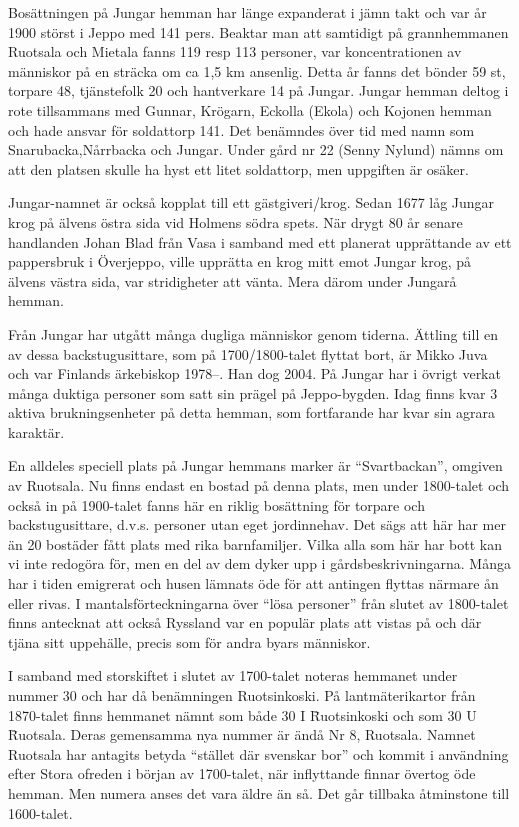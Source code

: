 Bosättningen på Jungar hemman har länge expanderat i jämn takt och var år 1900 störst i Jeppo med 141 pers. Beaktar man att samtidigt på grannhemmanen Ruotsala och Mietala fanns 119 resp 113 personer, var koncentrationen av människor på en sträcka om ca 1,5 km ansenlig. Detta år fanns det bönder 59 st, torpare 48, tjänstefolk 20 och hantverkare 14 på Jungar. Jungar hemman deltog i rote tillsammans med Gunnar, Krögarn, Eckolla (Ekola) och Kojonen hemman och hade ansvar för soldattorp 141. Det benämndes över tid med namn som Snarubacka,Nårrbacka och Jungar. Under gård nr 22 (Senny Nylund) nämns om att den platsen skulle ha hyst ett litet soldattorp, men uppgiften är osäker.

Jungar-namnet är också kopplat till ett gästgiveri/krog. Sedan 1677 låg Jungar krog på älvens östra sida vid Holmens södra spets. När  drygt 80 år senare handlanden Johan Blad från Vasa i samband med ett planerat upprättande av ett pappersbruk i Överjeppo, ville upprätta en krog mitt emot Jungar krog,  på älvens västra sida, var stridigheter att vänta. Mera därom under Jungarå hemman.

Från Jungar har utgått många dugliga människor genom tiderna. Ättling till en av dessa backstugusittare, som på 1700/1800-talet flyttat bort, är Mikko Juva och var Finlands ärkebiskop 1978--. Han dog 2004. På Jungar har i övrigt verkat många duktiga personer som satt sin prägel på Jeppo-bygden. Idag finns kvar 3 aktiva brukningsenheter på detta hemman, som fortfarande har kvar sin agrara karaktär.

En alldeles speciell plats på Jungar hemmans marker är ``Svartbackan'', omgiven av Ruotsala. Nu finns endast en bostad på denna plats, men under 1800-talet och också in på 1900-talet fanns här en riklig bosättning för torpare och backstugusittare, d.v.s. personer utan eget jordinnehav. Det sägs att här har mer än 20 bostäder fått plats med rika barnfamiljer. Vilka alla som här har bott kan vi inte redogöra för, men en del av dem dyker upp i gårdsbeskrivningarna. Många har i tiden emigrerat och husen lämnats öde för att antingen flyttas närmare ån eller rivas. I mantalsförteckningarna över ``lösa personer'' från slutet av 1800-talet finns antecknat att också Ryssland var en populär plats att vistas på och där tjäna sitt uppehälle, precis som för andra byars människor.



I samband med storskiftet i slutet av 1700-talet noteras hemmanet under nummer 30 och har då benämningen Ruotsinkoski. På lantmäterikartor från 1870-talet finns hemmanet nämnt som både 30 I \= Ruotsinkoski och som 30 U \= Ruotsala. Deras gemensamma nya nummer är ändå Nr 8, Ruotsala. Namnet Ruotsala har antagits betyda ``stället där svenskar bor'' och kommit i användning efter Stora ofreden i början av 1700-talet, när inflyttande finnar övertog öde hemman. Men numera anses det vara äldre än så. Det går tillbaka åtminstone till 1600-talet.

